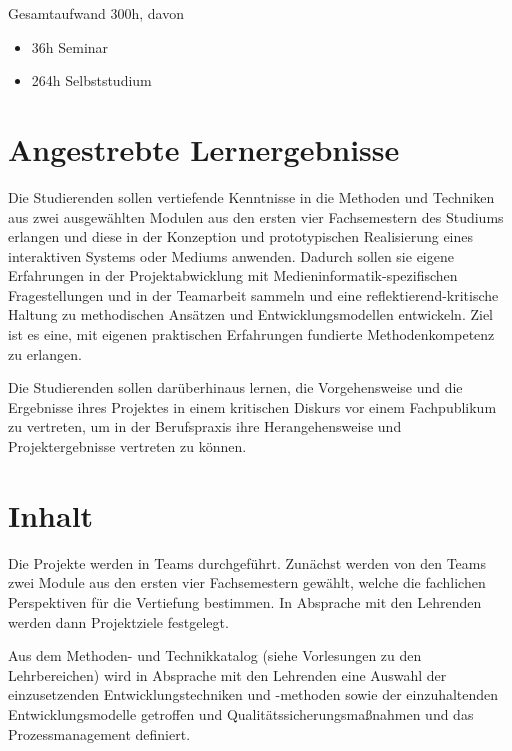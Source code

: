 Gesamtaufwand 300h, davon

\begin{itemize}
\tightlist
\item
  36h Seminar
\item
  264h Selbststudium
\end{itemize}

\section*{Angestrebte
Lernergebnisse\label{/mi-2017/modulbeschreibungen-bachelor/BA_Entwicklungsprojekt}}\label{angestrebte-lernergebnissepathlabelmi-2017modulbeschreibungen-bachelorbaux5fentwicklungsprojekt}

Die Studierenden sollen vertiefende Kenntnisse in die Methoden und
Techniken aus zwei ausgewählten Modulen aus den ersten vier
Fachsemestern des Studiums erlangen und diese in der Konzeption und
prototypischen Realisierung eines interaktiven Systems oder Mediums
anwenden. Dadurch sollen sie eigene Erfahrungen in der Projektabwicklung
mit Medieninformatik-spezifischen Fragestellungen und in der Teamarbeit
sammeln und eine reflektierend-kritische Haltung zu methodischen
Ansätzen und Entwicklungsmodellen entwickeln. Ziel ist es eine, mit
eigenen praktischen Erfahrungen fundierte Methodenkompetenz zu erlangen.

Die Studierenden sollen darüberhinaus lernen, die Vorgehensweise und die
Ergebnisse ihres Projektes in einem kritischen Diskurs vor einem
Fachpublikum zu vertreten, um in der Berufspraxis ihre Herangehensweise
und Projektergebnisse vertreten zu können.

\section*{Inhalt\label{/mi-2017/modulbeschreibungen-bachelor/BA_Entwicklungsprojekt}}\label{inhaltpathlabelmi-2017modulbeschreibungen-bachelorbaux5fentwicklungsprojekt}

Die Projekte werden in Teams durchgeführt. Zunächst werden von den Teams
zwei Module aus den ersten vier Fachsemestern gewählt, welche die
fachlichen Perspektiven für die Vertiefung bestimmen. In Absprache mit
den Lehrenden werden dann Projektziele festgelegt.

Aus dem Methoden- und Technikkatalog (siehe Vorlesungen zu den
Lehrbereichen) wird in Absprache mit den Lehrenden eine Auswahl der
einzusetzenden Entwicklungstechniken und -methoden sowie der
einzuhaltenden Entwicklungsmodelle getroffen und
Qualitätssicherungsmaßnahmen und das Prozessmanagement definiert.

